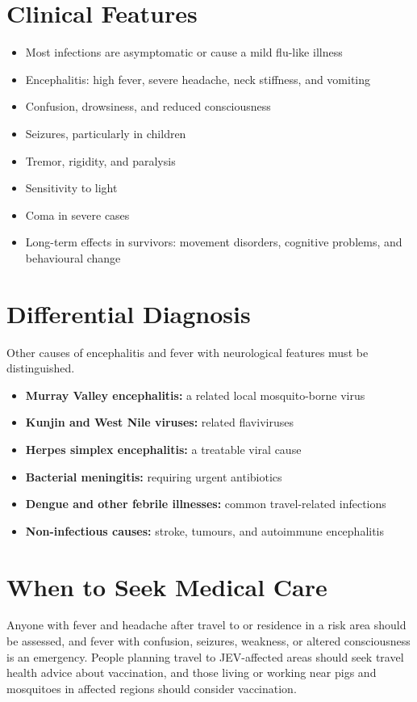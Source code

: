 \section*{Clinical Features}
\begin{itemize}
    \item Most infections are asymptomatic or cause a mild flu-like illness
    \item Encephalitis: high fever, severe headache, neck stiffness, and vomiting
    \item Confusion, drowsiness, and reduced consciousness
    \item Seizures, particularly in children
    \item Tremor, rigidity, and paralysis
    \item Sensitivity to light
    \item Coma in severe cases
    \item Long-term effects in survivors: movement disorders, cognitive problems, and behavioural change
\end{itemize}

\section*{Differential Diagnosis}
Other causes of encephalitis and fever with neurological features must be distinguished.
\begin{itemize}
    \item \textbf{Murray Valley encephalitis:} a related local mosquito-borne virus
    \item \textbf{Kunjin and West Nile viruses:} related flaviviruses
    \item \textbf{Herpes simplex encephalitis:} a treatable viral cause
    \item \textbf{Bacterial meningitis:} requiring urgent antibiotics
    \item \textbf{Dengue and other febrile illnesses:} common travel-related infections
    \item \textbf{Non-infectious causes:} stroke, tumours, and autoimmune encephalitis
\end{itemize}

\section*{When to Seek Medical Care}
Anyone with fever and headache after travel to or residence in a risk area should be assessed, and fever with confusion, seizures, weakness, or altered consciousness is an emergency. People planning travel to JEV-affected areas should seek travel health advice about vaccination, and those living or working near pigs and mosquitoes in affected regions should consider vaccination.

